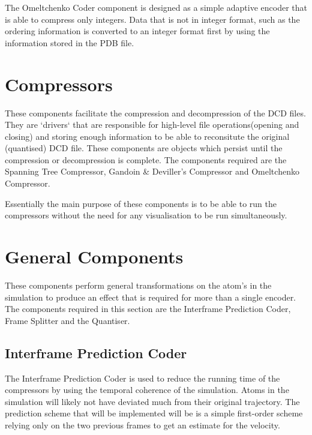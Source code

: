 \documentclass[a4paper,11pt]{report}
\begin{document}
The Omeltchenko Coder component is designed as a simple adaptive encoder that is able to compress only integers. Data that is not in integer format, such as the ordering information is converted to an integer format first by using the information stored in the PDB file.

\section{Compressors}

These components facilitate the compression and decompression of the DCD files. They are `drivers` that are responsible for high-level file operations(opening and closing) and storing enough information to be able to reconsitute the original (quantised) DCD file. These components are objects which persist until the compression or decompression is complete. The components required are the Spanning Tree Compressor, Gandoin \& Deviller's Compressor and Omeltchenko Compressor.

Essentially the main purpose of these components is to be able to run the compressors without the need for any visualisation to be run simultaneously.

\section{General Components}

These components perform general transformations on the atom's in the simulation to produce an effect that is required for more than a single encoder. The components required in this section are the Interframe Prediction Coder, Frame Splitter and the Quantiser.







\subsection{Interframe Prediction Coder}

The Interframe Prediction Coder is used to reduce the running time of the compressors by using the temporal coherence of the simulation. Atoms in the simulation will likely not have deviated much from their original trajectory. The prediction scheme that will be implemented will be is a simple first-order scheme relying only on the two previous frames to get an estimate for the velocity.
\end{document}
